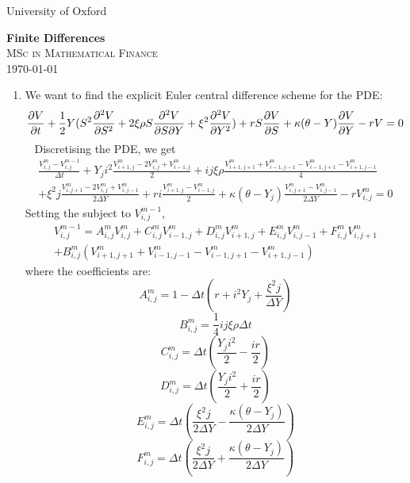 \documentclass{article}
\begin{document}
\begin{titlepage}
\vspace*{5 cm}

\centering
{\LARGE  University of Oxford\par}
\vspace*{3 cm}

{\Huge \bf Finite Differences}\\[0.2\baselineskip]

\vspace*{2\baselineskip}
\scshape
 MSc in Mathematical Finance\\
\today\par
\vspace*{2\baselineskip}
\vfill
\end{titlepage}

\begin{enumerate}
\item We want to find the explicit Euler central difference scheme for the PDE:
\[\pdv{V}{t} + \frac{1}{2}Y(S^2\pdv[2]{V}{S} + 2\xi\rho{S}\pdv{V}{S}{Y} + \xi^2\pdv[2]{V}{Y}) + rS\pdv{V}{S} + \kappa(\theta -Y)\pdv{V}{Y} - rV = 0\]\
\newline 
Discretising the PDE, we get
\begin{align*}
\frac{V^{m}_{i,j}-V^{m-1}_{i,j}}{\Delta{t}} + Y_ji^2\frac{V^m_{i+1,j}-2V^m_{i,j}+V^m_{i-1,j}}{2} +  ij\xi\rho\frac{V^m_{i+1,j+1}+V^m_{i-1,j-1}-V^m_{i-1,j+1}-V^m_{i+1,j-1}}{4} \\
+ \xi^2j\frac{V^m_{i,j+1}-2V^m_{i,j}+V^m_{i,j-1}}{2\Delta{Y}} + ri\frac{V^m_{i+1,j}-V^m_{i-1,j}}{2} + \kappa(\theta-Y_j)\frac{V^m_{i,j+1}-V^m_{i,j-1}}{2\Delta{Y}} - rV^m_{i,j} = 0
\end{align*}
Setting the subject to $V^{m-1}_{i,j}$, 
\begin{align*}
V^{m-1}_{i,j} = A^m_{i,j}V^m_{i,j} + C^m_{i,j}V^m_{i-1,j} + D^m_{i,j}V^m_{i+1,j} + E^m_{i,j}V^m_{i,j-1} + F^m_{i,j}V^m_{i,j+1} \\
+B^m_{i,j}(V^m_{i+1,j+1}+V^m_{i-1,j-1}-V^m_{i-1,j+1}-V^m_{i+1,j-1})
\end{align*}
where the coefficients are:
\[A^m_{i,j} = 1 - \Delta{t}(r+i^2Y_j+\frac{\xi^2j}{\Delta{Y}})\]
\[B^m_{i,j} = \frac{1}{4} ij\xi\rho\Delta{t}\]
\[C^m_{i,j} = \Delta{t}(\frac{Y_ji^2}{2} - \frac{ir}{2})\]
\[D^m_{i,j} = \Delta{t}(\frac{Y_ji^2}{2} + \frac{ir}{2})\]
\[E^m_{i,j} = \Delta{t}(\frac{\xi^2j}{2\Delta{Y}} - \frac{\kappa(\theta-Y_j)}{2\Delta{Y}})\]
\[F^m_{i,j} = \Delta{t}(\frac{\xi^2j}{2\Delta{Y}} + \frac{\kappa(\theta-Y_j)}{2\Delta{Y}})\] 


\end{enumerate}
\end{document}
